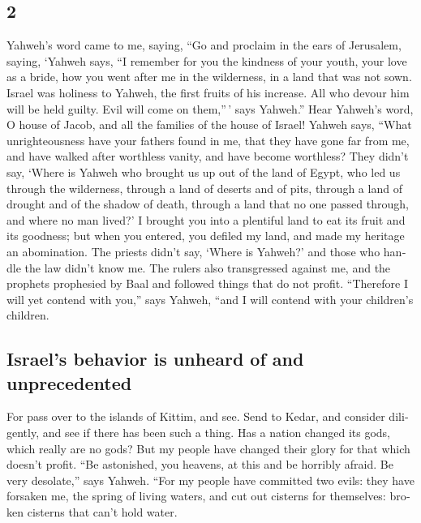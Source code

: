 \begin{paracol}{2}
\begin{otherlanguage}{english}
\hypertarget{section-3}{%
\section{2}\label{section-3}}

 Yahweh's word came to me, saying,  ``Go and
proclaim in the ears of Jerusalem, saying, `Yahweh says, ``I remember
for you the kindness of your youth, your love as a bride, how you went
after me in the wilderness, in a land that was not sown. 
Israel was holiness to Yahweh, the first fruits of his increase. All who
devour him will be held guilty. Evil will come on them,''\,' says
Yahweh.''  Hear Yahweh's word, O house of Jacob, and all
the families of the house of Israel!  Yahweh says, ``What
unrighteousness have your fathers found in me, that they have gone far
from me, and have walked after worthless vanity, and have become
worthless?  They didn't say, `Where is Yahweh who brought
us up out of the land of Egypt, who led us through the wilderness,
through a land of deserts and of pits, through a land of drought and of
the shadow of death, through a land that no one passed through, and
where no man lived?'  I brought you into a plentiful land
to eat its fruit and its goodness; but when you entered, you defiled my
land, and made my heritage an abomination.  The priests
didn't say, `Where is Yahweh?' and those who handle the law didn't know
me. The rulers also transgressed against me, and the prophets prophesied
by Baal and followed things that do not profit. 
``Therefore I will yet contend with you,'' says Yahweh, ``and I will
contend with your children's children.

\hypertarget{israels-behavior-is-unheard-of-and-unprecedented}{%
\subsection{Israel's behavior is unheard of and
unprecedented}\label{israels-behavior-is-unheard-of-and-unprecedented}}

 For pass over to the islands of Kittim, and see. Send to
Kedar, and consider diligently, and see if there has been such a thing.
 Has a nation changed its gods, which really are no gods?
But my people have changed their glory for that which doesn't profit.
 ``Be astonished, you heavens, at this and be horribly
afraid. Be very desolate,'' says Yahweh.  ``For my people
have committed two evils: they have forsaken me, the spring of living
waters, and cut out cisterns for themselves: broken cisterns that can't
hold water.


\end{otherlanguage}
\end{paracol}
